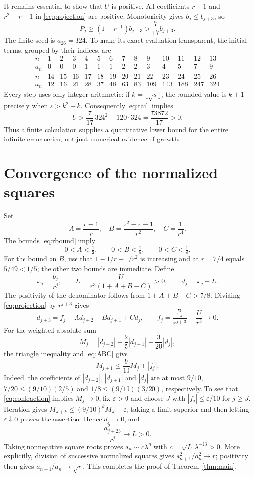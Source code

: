 \documentclass[11pt]{article}
\begin{document}
It remains essential to show that $U$ is positive. All coefficients
$r-1$ and $r^2-r-1$ in \eqref{eq:projection} are positive. Monotonicity
gives $b_j\le b_{j+3}$, so
\[
 P_j\ge (1-r^{-1})b_{j+3}>\frac7{17}b_{j+3}.
\]
The finite seed is $a_{26}=324$. To make its exact evaluation transparent,
the initial terms, grouped by their indices, are
\[
\begin{array}{c|rrrrrrrrrrrrr}
 n&1&2&3&4&5&6&7&8&9&10&11&12&13\\\hline
 a_n&0&0&0&1&1&1&2&2&3&4&5&7&9\\[2pt]
 n&14&15&16&17&18&19&20&21&22&23&24&25&26\\\hline
 a_n&12&16&21&28&37&48&63&83&109&143&188&247&324
\end{array}
\]
Every step uses only integer arithmetic: if $k=\lfloor\sqrt{s}\rfloor$,
the rounded value is $k+1$ precisely when $s>k^2+k$.
Consequently \eqref{eq:tail} implies
\begin{equation}\label{eq:positive}
 U>\frac7{17}\,324^2-120\cdot324
   =\frac{73872}{17}>0.
\end{equation}
Thus a finite calculation supplies a quantitative lower bound for the
entire infinite error series, not just numerical evidence of growth.

\section{Convergence of the normalized squares}
Set
\[
 A=\frac{r-1}{r},\quad B=\frac{r^2-r-1}{r^2},\quad C=\frac1{r^4}.
\]
The bounds \eqref{eq:rbound} imply
\begin{equation}\label{eq:ABC}
 0<A<\tfrac12,\qquad 0<B<\tfrac15,\qquad 0<C<\tfrac18.
\end{equation}
For the bound on $B$, use that $1-1/r-1/r^2$ is increasing and at $r=7/4$
equals $5/49<1/5$; the other two bounds are immediate.
Define
\[
 x_j=\frac{b_j}{r^j},\qquad
 L=\frac{U}{r^3(1+A+B-C)}>0,\qquad d_j=x_j-L.
\]
The positivity of the denominator follows from $1+A+B-C>7/8$.
Dividing \eqref{eq:projection} by $r^{j+3}$ gives
\[
 d_{j+3}=f_j-Ad_{j+2}-Bd_{j+1}+Cd_j,\qquad
 f_j=\frac{P_j}{r^{j+3}}-\frac U{r^3}\longrightarrow0.
\]
For the weighted absolute sum
\[
 M_j=|d_{j+2}|+\frac25|d_{j+1}|+\frac3{20}|d_j|,
\]
the triangle inequality and \eqref{eq:ABC} give
\begin{equation}\label{eq:contraction}
 M_{j+1}\le\frac9{10}M_j+|f_j|.
\end{equation}
Indeed, the coefficients of $|d_{j+2}|$, $|d_{j+1}|$ and $|d_j|$
are at most $9/10$, $7/20\le(9/10)(2/5)$ and
$1/8\le(9/10)(3/20)$, respectively.
To see that \eqref{eq:contraction} implies $M_j\to0$, fix
$\varepsilon>0$ and choose $J$ with $|f_j|\le\varepsilon/10$ for $j\ge J$.
Iteration gives
$M_{J+k}\le(9/10)^kM_J+\varepsilon$; taking a limit superior and then
letting $\varepsilon\downarrow0$ proves the assertion.
Hence $d_j\to0$, and
\[
 \frac{a_{j+23}^2}{r^j}\longrightarrow L>0.
\]
Taking nonnegative square roots proves
$a_n\sim c\lambda^n$ with $c=\sqrt L\,\lambda^{-23}>0$.
More explicitly, division of successive normalized squares gives
$a_{n+1}^2/a_n^2\to r$; positivity then gives
$a_{n+1}/a_n\to\sqrt r$. This completes the proof of
Theorem~\ref{thm:main}.
\end{document}

